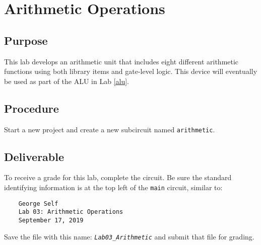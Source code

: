 \chapter{Arithmetic Operations}\label{arith}

\section{Purpose}

This lab develops an arithmetic unit that includes eight different arithmetic functions using both \LE library items and gate-level logic. This device will eventually be used as part of the \acf{ALU} in Lab \ref{alu}.

\section{Procedure}

Start a new \LE project and create a new subcircuit named \lstinline[columns=fixed]|arithmetic|.

\section{Deliverable}

To receive a grade for this lab, complete the circuit. Be sure the standard identifying information is at the top left of the \lstinline{main} circuit, similar to: 

\bigskip
\begin{minipage}{\linewidth}
	\begin{verbatim}
	George Self
	Lab 03: Arithmetic Operations
	September 17, 2019
	\end{verbatim}
\end{minipage}
\bigskip

Save the file with this name: \emph{\texttt{Lab03\_Arithmetic}} and submit that file for grading.

